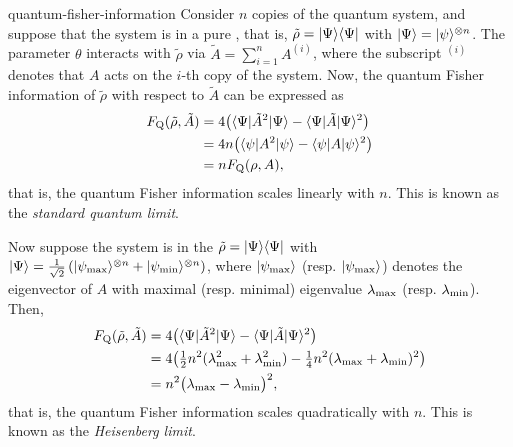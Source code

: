 \begin{example}{quantum-fisher-information}
    Consider $n$ copies of the quantum system, and suppose that the system is in a pure , that is, $\tilde{\rho} = |\Psi\rangle \langle\Psi|$ with $|\Psi\rangle = |\psi\rangle^{\otimes n}$. The parameter $\theta$ interacts with $\tilde{\rho}$ via $\tilde{A} = \sum_{i = 1}^{n} A^{(i)}$, where the subscript $^{(i)}$ denotes that $A$ acts on the $i$-th copy of the system. Now, the quantum Fisher information of $\tilde{\rho}$ with respect to $\tilde{A}$ can be expressed as
    \[ \begin{aligned}
        F_\textup{Q}(\tilde{\rho}, \tilde{A})
            &= 4 \big( \langle\Psi| \tilde{A}^2 |\Psi\rangle - \langle\Psi| \tilde{A} |\Psi\rangle^2 \big) \\
            &= 4 n \big( \langle\psi| A^2 |\psi\rangle - \langle\psi| A |\psi\rangle^2 \big) \\
            &= n F_\textup{Q}(\rho, A) ,
    \end{aligned} \]
    that is, the quantum Fisher information scales linearly with $n$. This is known as the \textit{standard quantum limit}.
    
    Now suppose the system is in the  $\tilde{\rho} = |\Psi\rangle \langle\Psi|$ with $|\Psi\rangle = \frac{1}{\sqrt{2}} \left( |\psi_\textup{max}\rangle^{\otimes n} + |\psi_\textup{min}\rangle^{\otimes n} \right)$, where $|\psi_\textup{max}\rangle$ (resp. $|\psi_\textup{max}\rangle$) denotes the eigenvector of $A$ with maximal (resp. minimal) eigenvalue $\lambda_\textup{max}$ (resp. $\lambda_\textup{min}$). Then,
    \[ \begin{aligned}
        F_\textup{Q}(\tilde{\rho}, \tilde{A})
            &= 4 \big( \langle\Psi| \tilde{A}^2 |\Psi\rangle - \langle\Psi| \tilde{A} |\Psi\rangle^2 \big) \\
            &= 4 \big( \tfrac{1}{2} n^2 (\lambda_\textup{max}^2 + \lambda_\textup{min}^2) - \tfrac{1}{4} n^2 (\lambda_\textup{max} + \lambda_\textup{min})^2 \big) \\
            &= n^2 \big( \lambda_\textup{max} - \lambda_\textup{min} \big)^2 ,
    \end{aligned} \]
    that is, the quantum Fisher information scales quadratically with $n$. This is known as the \textit{Heisenberg limit}.
\end{example}
